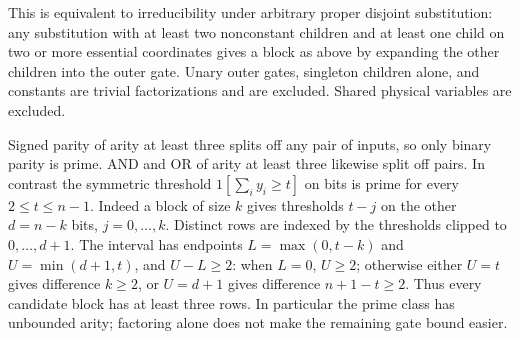\documentclass{article}
\begin{document}
This is equivalent to irreducibility under arbitrary proper disjoint
substitution: any substitution with at least two nonconstant children
and at least one child on two or more essential coordinates gives a
block as above by expanding the other children into the outer gate.
Unary outer gates, singleton children alone, and constants are trivial
factorizations and are excluded. Shared physical variables are excluded.

Signed parity of arity at least three splits off any pair of inputs,
so only binary parity is prime. AND and OR of arity at least three
likewise split off pairs. In contrast the symmetric threshold
$1[\sum_i y_i\ge t]$ on bits is prime for every $2\le t\le n-1$.
Indeed a block of size $k$ gives thresholds $t-j$ on the other $d=n-k$
bits, $j=0,\ldots,k$. Distinct rows are indexed by the thresholds
clipped to $0,\ldots,d+1$. The interval has endpoints
$L=\max(0,t-k)$ and $U=\min(d+1,t)$, and $U-L\ge2$: when $L=0$,
$U\ge2$; otherwise either $U=t$ gives difference $k\ge2$, or
$U=d+1$ gives difference $n+1-t\ge2$. Thus every candidate block
has at least three rows. In particular the prime class has unbounded
arity; factoring alone does not make the remaining gate bound easier.
\end{document}
